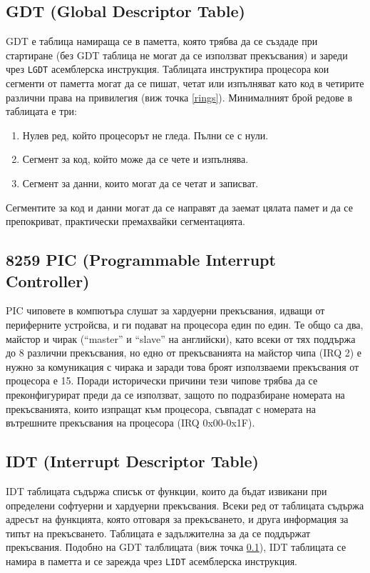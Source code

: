   \subsection{GDT (Global Descriptor Table)} \label{gdt}
  GDT е таблица намираща се в паметта, която трябва да се създаде при стартиране (без GDT таблица не могат да се използват прекъсвания) и зареди чрез {\tt LGDT} асемблерска инструкция. Таблицата инструктира процесора кои сегменти от паметта могат да се пишат, четат или изпълняват като код в четирите различни права на привилегия (виж точка \ref{rings}). Минималният брой редове в таблицата е три:
  \begin{enumerate}
    \item Нулев ред, който процесорът не гледа. Пълни се с нули.
    \item Сегмент за код, който може да се чете и изпълнява.
    \item Сегмент за данни, които могат да се четат и записват.
  \end{enumerate}
  Сегментите за код и данни могат да се направят да заемат цялата памет и да се препокриват, практически премахвайки сегментацията.

  \subsection{8259 PIC (Programmable Interrupt Controller)} \label{pic}
  PIC чиповете в компютъра слушат за хардуерни прекъсвания, идващи от периферните устройсва, и ги подават на процесора един по един. Те общо са два, майстор и чирак (``master'' и ``slave'' на английски), като всеки от тях поддържа до 8 различни прекъсвания, но едно от прекъсванията на майстор чипа (IRQ 2) е нужно за комуникация с чирака и заради това броят използваеми прекъсвания от процесора е 15. Поради исторически причини тези чипове трябва да се преконфигурират преди да се използват, защото по подразбиране номерата на прекъсванията, които изпращат към процесора, съвпадат с номерата на вътрешните прекъсвания на процесора (IRQ 0x00-0x1F).

  \subsection{IDT (Interrupt Descriptor Table)} \label{idt}
  IDT таблицата съдържа списък от функции, които да бъдат извикани при определени софтуерни и хардуерни прекъсвания. Всеки ред от таблицата съдържа адресът на функцията, която отговаря за прекъсването, и друга информация за типът на прекъсването. Таблицата е задължителна за да се поддържат прекъсвания. Подобно на GDT талблицата (виж точка \ref{gdt}), IDT таблицата се намира в паметта и се зарежда чрез {\tt LIDT} асемблерска инструкция.

